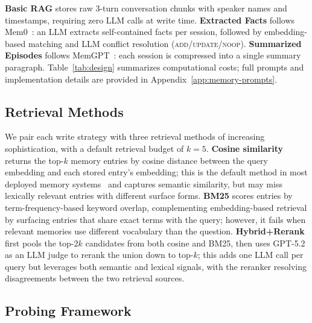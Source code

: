 \documentclass{article} %
\begin{document}
\textbf{Basic RAG} stores raw 3-turn conversation chunks with speaker names and timestamps, requiring zero LLM calls at write time.  
\textbf{Extracted Facts} follows Mem0~\citep{chhikara2025mem0}: an LLM extracts self-contained facts per session, followed by embedding-based matching and LLM conflict resolution (\textsc{add}/\textsc{update}/\textsc{noop}).  
\textbf{Summarized Episodes} follows MemGPT~\citep{packer2023memgpt}: each session is compressed into a single summary paragraph. Table~\ref{tab:design} summarizes computational costs; full prompts and implementation details are provided in Appendix~\ref{app:memory-prompts}.




\subsection{Retrieval Methods}
\label{sec:retrieval}

We pair each write strategy with three retrieval methods of increasing sophistication, with a default retrieval budget of $k{=}5$. \textbf{Cosine similarity} returns the top-$k$ memory entries by cosine distance between the query embedding and each stored entry's embedding; this is the default method in most deployed memory systems~\citep{chhikara2025mem0, xu2025amem} and captures semantic similarity, but may miss lexically relevant entries with different surface forms. \textbf{BM25} scores entries by term-frequency-based keyword overlap, complementing embedding-based retrieval by surfacing entries that share exact terms with the query; however, it fails when relevant memories use different vocabulary than the question. \textbf{Hybrid+Rerank} first pools the top-$2k$ candidates from both cosine and BM25, then uses GPT-5.2 as an LLM judge to rerank the union down to top-$k$; this adds one LLM call per query but leverages both semantic and lexical signals, with the reranker resolving disagreements between the two retrieval sources.

\subsection{Probing Framework}
\end{document}
